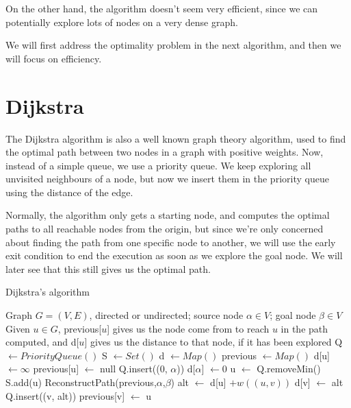 \documentclass[12pt]{report}
\begin{document}

On  the other hand, the algorithm doesn't seem very efficient, since we can potentially explore lots of nodes on a very dense graph.

We will first address the optimality problem in the next algorithm, and then we will focus on efficiency.

\section{Dijkstra}
The Dijkstra algorithm is also a well known graph theory algorithm, used to find the optimal path between two nodes in a graph with positive weights. Now, instead of a simple queue, we use a priority queue. We keep exploring all unvisited neighbours of a node, but now we insert them in the priority queue using the distance of the edge.

Normally, the algorithm only gets a starting node, and computes the optimal paths to all reachable nodes from the origin, but since we're only concerned about finding the path from one specific node to another, we will use the early exit condition to end the execution as soon as we explore the goal node. We will later see that this still gives us the optimal path.

\begin{algorithm}
\caption{Dijkstra's algorithm}
\label{alg:dijkstra}
\begin{algorithmic}[1]
\Require Graph $G = (V, E)$, directed or undirected; source node $\alpha \in V$; goal node $\beta \in V$
\Ensure Given $u \in G$, previous[$u$] gives us the node come from to reach $u$ in the path computed, and d[$u$] gives us the distance to that node, if it has been explored
\State Q $\gets PriorityQueue()$
\State S $\gets Set()$
\State d $\gets Map()$ 
\State previous $\gets Map()$
	\State d[u] $\gets \infty$
	\State previous[u] $\gets$ null
\EndFor
\State Q.insert((0, $\alpha$))
\State d[$\alpha$] $\gets 0$
	\State u $\gets$ Q.removeMin()
	\State S.add(u)
	 
		\State \Return ReconstructPath(previous,$\alpha$,$\beta$)
	\EndIf
			\Continue {}
		\EndIf
		\State alt $\gets$ d[u] $+ w((u, v))$
			\State d[v] $\gets$ alt
			\State Q.insert((v, alt))
			\State previous[v] $\gets$ u
		\EndIf
	\EndFor
\EndWhile
\EndProcedure
\end{algorithmic}
\end{algorithm}
\end{document}
